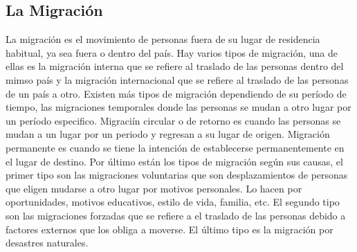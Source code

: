 \documentclass[12pt]{report}
\begin{document}
\subsection{La Migración}
La migración es el movimiento de personas fuera de su lugar de residencia habitual, ya sea fuera o dentro del país. Hay varios tipos de migración, una de ellas es la migración interna que se refiere al traslado de las personas dentro del mimso país y la migración internacional que se refiere al traslado de las personas de un país a otro. Existen más tipos de migración dependiendo de su período de tiempo, las migraciones temporales donde las personas se mudan a otro lugar por un período especifico. Migraciín circular o de retorno es cuando las personas se mudan a un lugar por un periodo y regresan a su lugar de origen. Migración permanente es cuando se tiene la intención de establecerse permanentemente en el lugar de destino. Por último están los tipos de migración según sus causas, el primer tipo son las migraciones voluntarias que son desplazamientos de personas que eligen mudarse a otro lugar por motivos personales. Lo hacen por oportunidades, motivos educativos, estilo de vida, familia, etc. El segundo tipo son las migraciones forzadas que se refiere a el traslado de las personas debido a factores externos que los obliga a moverse. El último tipo es la migración por desastres naturales. \\
\end{document}
